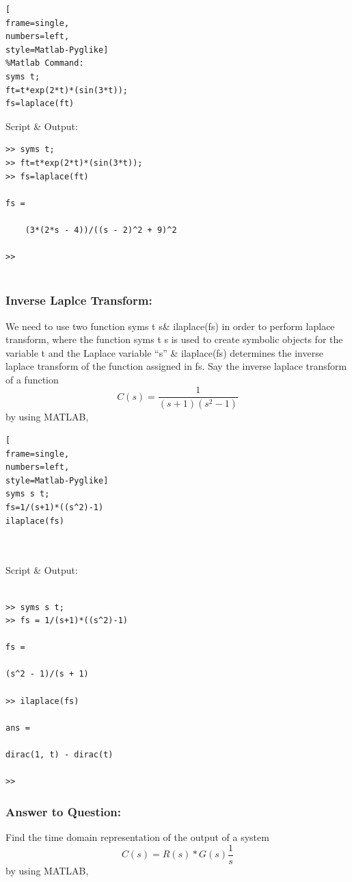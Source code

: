 \documentclass[conference]{IEEEtran}
\begin{document}
\begin{lstlisting}[
frame=single,
numbers=left,
style=Matlab-Pyglike]
%Matlab Command:
syms t;
ft=t*exp(2*t)*(sin(3*t));
fs=laplace(ft)
\end{lstlisting}

Script \& Output:

\begin{verbatim}
>> syms t;
>> ft=t*exp(2*t)*(sin(3*t));
>> fs=laplace(ft)
 
fs =
 
    (3*(2*s - 4))/((s - 2)^2 + 9)^2
 
>> 
    
\end{verbatim}



\subsubsection{Inverse Laplce Transform:}
We need to use two function syms t s\& 
ilaplace(fs) in order to perform laplace 
transform, where the function syms t s is 
used to create symbolic objects for the 
variable t and the Laplace variable “s” \& 
ilaplace(fs) determines the inverse laplace 
transform of the function assigned in fs.
Say the inverse laplace transform of a 
function
\[C(s) = \frac{1}{(s+1)(s^2 -1)}\]
by using MATLAB,
\vspace{9em}
\begin{lstlisting}[
frame=single,
numbers=left,
style=Matlab-Pyglike]
syms s t;
fs=1/(s+1)*((s^2)-1)
ilaplace(fs)



\end{lstlisting}

Script \& Output:

\begin{verbatim}

>> syms s t;
>> fs = 1/(s+1)*((s^2)-1)
 
fs =
 
(s^2 - 1)/(s + 1)
 
>> ilaplace(fs)
 
ans =
 
dirac(1, t) - dirac(t)
 
>> 
\end{verbatim}



\subsubsection{Answer to Question:}
Find the time domain representation of the output of a system
\[C(s) = R(s)*G(s) \frac{1}{s}  \]
by using MATLAB,
\end{document}
